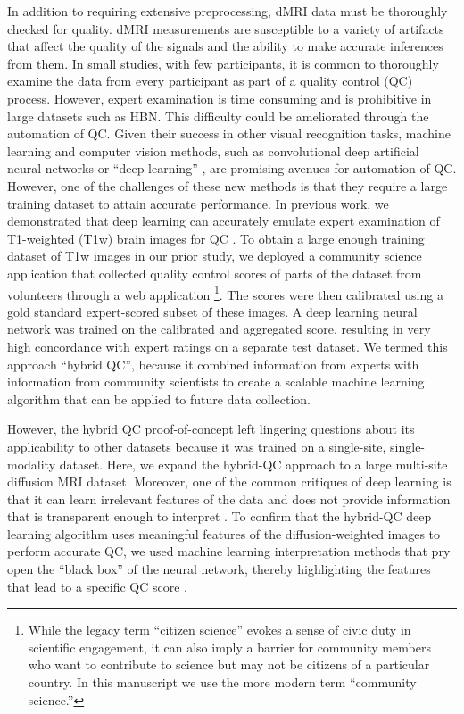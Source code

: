 \documentclass[9pt,lineno]{elife}
\begin{document}
In addition to requiring extensive preprocessing, dMRI data must be thoroughly checked for quality. dMRI measurements are susceptible to a variety of artifacts that affect
the quality of the signals and the ability to make accurate inferences from
them. In small studies, with few participants, it is common to thoroughly
examine the data from every participant as part of a quality control (QC)
process. However, expert examination is time consuming and is prohibitive in large
datasets such as HBN. This difficulty could be ameliorated through the
automation of QC. Given their success in other visual recognition tasks, machine learning and computer vision methods, such as convolutional deep
artificial neural networks or ``deep learning'' \citep{lecun2015deep}, are
promising avenues for automation of QC. However, one of the challenges of these new
methods is that they require a large training dataset to attain accurate
performance. In previous work, we demonstrated that deep learning can accurately
emulate expert examination of T1-weighted (T1w) brain images for QC
\citep{keshavan2019-er}. To obtain a large enough training dataset of T1w images
in our prior study, we deployed a community science application that collected quality
control scores of parts of the dataset from volunteers through a web application
\footnote{%
    While the legacy term ``citizen science'' evokes a sense of civic duty in
    scientific engagement, it can also imply a barrier for community members who
    want to contribute to science but may not be citizens of a particular
    country. In this manuscript we use the more modern term ``community
    science.''
}.
The scores were then calibrated using a gold standard expert-scored subset of
these images. A deep learning neural network was trained on the calibrated and
aggregated score, resulting in very high concordance with expert ratings on a
separate test dataset. We termed this approach ``hybrid QC'', because it combined
information from experts with information from community scientists to create a
scalable machine learning algorithm that can be applied to future data
collection.

However, the hybrid QC proof-of-concept left lingering questions about its
applicability to other datasets because it was trained on a single-site,
single-modality dataset. Here, we expand the hybrid-QC approach to a large
multi-site diffusion MRI dataset. Moreover, one of the common critiques of deep
learning is that it can learn irrelevant features of the data and does not
provide information that is transparent enough to interpret
\citep{lipton2017doctor, salahuddin2022transparency, Zech2018-ki}. To confirm
that the hybrid-QC deep learning algorithm uses meaningful features of the
diffusion-weighted images to perform accurate QC, we used machine learning
interpretation methods that pry open the ``black box'' of the neural network, thereby
highlighting the features that lead to a specific QC score
\citep{sundararajan2017axiomatic,murdoch2019definitions}.
\end{document}
